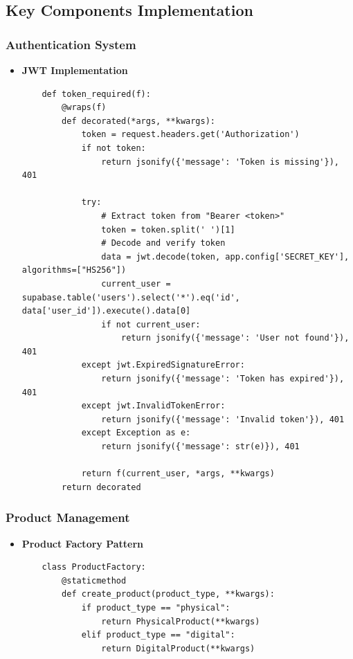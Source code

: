 \documentclass[12pt,a4paper]{article}
\begin{document}
\subsection{Key Components Implementation}

\subsubsection{Authentication System}
\begin{itemize}
    \item \textbf{JWT Implementation}
    \begin{verbatim}
    def token_required(f):
        @wraps(f)
        def decorated(*args, **kwargs):
            token = request.headers.get('Authorization')
            if not token:
                return jsonify({'message': 'Token is missing'}), 401
            
            try:
                # Extract token from "Bearer <token>"
                token = token.split(' ')[1]
                # Decode and verify token
                data = jwt.decode(token, app.config['SECRET_KEY'], algorithms=["HS256"])
                current_user = supabase.table('users').select('*').eq('id', data['user_id']).execute().data[0]
                if not current_user:
                    return jsonify({'message': 'User not found'}), 401
            except jwt.ExpiredSignatureError:
                return jsonify({'message': 'Token has expired'}), 401
            except jwt.InvalidTokenError:
                return jsonify({'message': 'Invalid token'}), 401
            except Exception as e:
                return jsonify({'message': str(e)}), 401

            return f(current_user, *args, **kwargs)
        return decorated
    \end{verbatim}
\end{itemize}

\subsubsection{Product Management}
\begin{itemize}
    \item \textbf{Product Factory Pattern}
    \begin{verbatim}
    class ProductFactory:
        @staticmethod
        def create_product(product_type, **kwargs):
            if product_type == "physical":
                return PhysicalProduct(**kwargs)
            elif product_type == "digital":
                return DigitalProduct(**kwargs)
    \end{verbatim}
\end{itemize}
\end{document}
